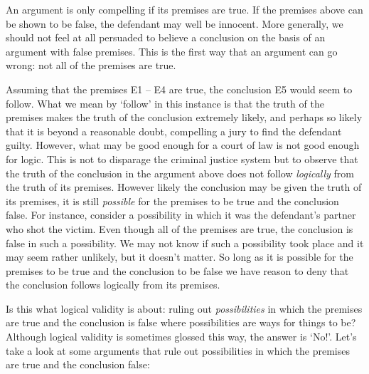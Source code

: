\begin{earg}
\end{earg}

An argument is only compelling if its premises are true.
If the premises above can be shown to be false, the defendant may well be innocent.
More generally, we should not feel at all persuaded to believe a conclusion on the basis of an argument with false premises. 
This is the first way that an argument can go wrong: not all of the premises are true.

Assuming that the premises E1 -- E4 are true, the conclusion E5 would seem to follow.
What we mean by `follow' in this instance is that the truth of the premises makes the truth of the conclusion extremely likely, and perhaps so likely that it is beyond a reasonable doubt, compelling a jury to find the defendant guilty.
However, what may be good enough for a court of law is not good enough for logic.
This is not to disparage the criminal justice system but to observe that the truth of the conclusion in the argument above does not follow \textit{logically} from the truth of its premises.
However likely the conclusion may be given the truth of its premises, it is still \textit{possible} for the premises to be true and the conclusion false.
For instance, consider a possibility in which it was the defendant's partner who shot the victim.
Even though all of the premises are true, the conclusion is false in such a possibility.
We may not know if such a possibility took place and it may seem rather unlikely, but it doesn't matter.
So long as it is possible for the premises to be true and the conclusion to be false we have reason to deny that the conclusion follows logically from its premises.

Is this what logical validity is about: ruling out \textit{possibilities} in which the premises are true and the conclusion is false where possibilities are ways for things to be?
Although logical validity is sometimes glossed this way, the answer is `No!'.
Let's take a look at some arguments that rule out possibilities in which the premises are true and the conclusion false:

\begin{earg}
\end{earg}


